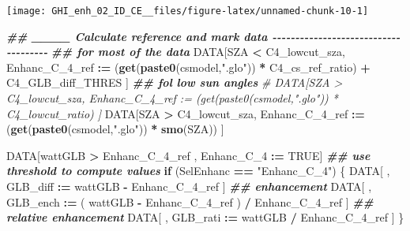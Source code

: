 \documentclass[
  10pt,
  a4paper,oneside]{article}
\newenvironment{Shaded}{\begin{snugshade}}{\end{snugshade}}
\newcommand{\AttributeTok}[1]{\textcolor[rgb]{0.13,0.29,0.53}{#1}}
\newcommand{\CommentTok}[1]{\textcolor[rgb]{0.56,0.35,0.01}{\textit{#1}}}
\newcommand{\ConstantTok}[1]{\textcolor[rgb]{0.56,0.35,0.01}{#1}}
\newcommand{\ControlFlowTok}[1]{\textcolor[rgb]{0.13,0.29,0.53}{\textbf{#1}}}
\newcommand{\DecValTok}[1]{\textcolor[rgb]{0.00,0.00,0.81}{#1}}
\newcommand{\DocumentationTok}[1]{\textcolor[rgb]{0.56,0.35,0.01}{\textbf{\textit{#1}}}}
\newcommand{\FunctionTok}[1]{\textcolor[rgb]{0.13,0.29,0.53}{\textbf{#1}}}
\newcommand{\NormalTok}[1]{#1}
\newcommand{\SpecialCharTok}[1]{\textcolor[rgb]{0.81,0.36,0.00}{\textbf{#1}}}
\newcommand{\StringTok}[1]{\textcolor[rgb]{0.31,0.60,0.02}{#1}}
\begin{document}
\begin{Shaded}
\end{Shaded}

\begin{center}\texttt{[image: GHI\_enh\_02\_ID\_CE\_\_files/figure-latex/unnamed-chunk-10-1]} \end{center}

\begin{Shaded}
\begin{Highlighting}[]
\DocumentationTok{\#\# \_\_\_\_ Calculate reference and mark data  {-}{-}{-}{-}{-}{-}{-}{-}{-}{-}{-}{-}{-}{-}{-}{-}{-}{-}{-}{-}{-}{-}{-}{-}{-}{-}{-}{-}{-}{-}{-}{-}{-}{-}{-}{-}{-}}
\DocumentationTok{\#\# for most of the data}
\NormalTok{DATA[SZA }\SpecialCharTok{\textless{}}\NormalTok{ C4\_lowcut\_sza, Enhanc\_C\_4\_ref }\SpecialCharTok{:=}\NormalTok{ (}\FunctionTok{get}\NormalTok{(}\FunctionTok{paste0}\NormalTok{(csmodel,}\StringTok{".glo"}\NormalTok{)) }\SpecialCharTok{*}\NormalTok{ C4\_cs\_ref\_ratio) }\SpecialCharTok{+}\NormalTok{ C4\_GLB\_diff\_THRES ]}
\DocumentationTok{\#\# fol low sun angles}
\CommentTok{\# DATA[SZA \textgreater{} C4\_lowcut\_sza, Enhanc\_C\_4\_ref := (get(paste0(csmodel,".glo")) * C4\_lowcut\_ratio) ]}
\NormalTok{DATA[SZA }\SpecialCharTok{\textgreater{}}\NormalTok{ C4\_lowcut\_sza, Enhanc\_C\_4\_ref }\SpecialCharTok{:=}\NormalTok{ (}\FunctionTok{get}\NormalTok{(}\FunctionTok{paste0}\NormalTok{(csmodel,}\StringTok{".glo"}\NormalTok{)) }\SpecialCharTok{*} \FunctionTok{smo}\NormalTok{(SZA)) ]}

\NormalTok{DATA[wattGLB }\SpecialCharTok{\textgreater{}}\NormalTok{ Enhanc\_C\_4\_ref ,}
\NormalTok{     Enhanc\_C\_4 }\SpecialCharTok{:=} \ConstantTok{TRUE}\NormalTok{]}
\DocumentationTok{\#\# use threshold to compute values}
\ControlFlowTok{if}\NormalTok{ (SelEnhanc }\SpecialCharTok{==} \StringTok{"Enhanc\_C\_4"}\NormalTok{) \{}
\NormalTok{    DATA[ , GLB\_diff }\SpecialCharTok{:=}\NormalTok{   wattGLB }\SpecialCharTok{{-}}\NormalTok{ Enhanc\_C\_4\_ref                    ] }\DocumentationTok{\#\# enhancement}
\NormalTok{    DATA[ , GLB\_ench }\SpecialCharTok{:=}\NormalTok{ ( wattGLB }\SpecialCharTok{{-}}\NormalTok{ Enhanc\_C\_4\_ref ) }\SpecialCharTok{/}\NormalTok{ Enhanc\_C\_4\_ref ] }\DocumentationTok{\#\# relative enhancement}
\NormalTok{    DATA[ , GLB\_rati }\SpecialCharTok{:=}\NormalTok{   wattGLB }\SpecialCharTok{/}\NormalTok{ Enhanc\_C\_4\_ref                    ]}
\NormalTok{\}}
\end{Highlighting}
\end{Shaded}
\end{document}
